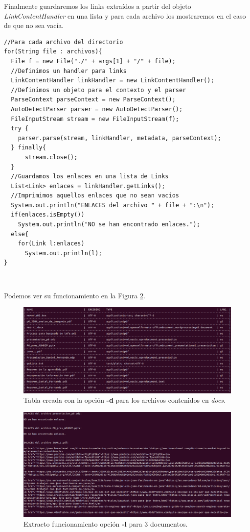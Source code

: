 \documentclass[12pt]{article}
\begin{document}
Finalmente guardaremos los links extraídos a partir del objeto \textit{LinkContentHandler} en una lista y para cada archivo los mostraremos en el caso de que no sea vacía.\\

\begin{lstlisting}
//Para cada archivo del directorio
for(String file : archivos){
  File f = new File("./" + args[1] + "/" + file);
  //Definimos un handler para links
  LinkContentHandler linkHandler = new LinkContentHandler();
  //Definimos un objeto para el contexto y el parser
  ParseContext parseContext = new ParseContext();
  AutoDetectParser parser = new AutoDetectParser();
  FileInputStream stream = new FileInputStream(f);
  try {
    parser.parse(stream, linkHandler, metadata, parseContext);
  } finally{
      stream.close();
  }
  //Guardamos los enlaces en una lista de Links
  List<Link> enlaces = linkHandler.getLinks();
  //Imprimimos aquellos enlaces que no sean vacios
  System.out.println("ENLACES del archivo " + file + ":\n");
  if(enlaces.isEmpty())
    System.out.println("NO se han encontrado enlaces.");
  else{
    for(Link l:enlaces)
      System.out.println(l);
}
\end{lstlisting}\

Podemos ver su funcionamiento en la Figura \ref{enlace}.

\clearpage

\begin{figure}[h]
\centering
\includegraphics[scale=0.33]{tabla.png}
\caption{Tabla creada con la opción \textbf{-d} para los archivos contenidos en \textit{docs}.}
\label{tabla}
\end{figure}

\begin{figure}[h]
\centering
\includegraphics[scale=0.32]{enlaces.png}
\caption{Extracto funcionamiento opción \textbf{-l} para 3 documentos.}
\label{enlace}
\end{figure}
\end{document}
